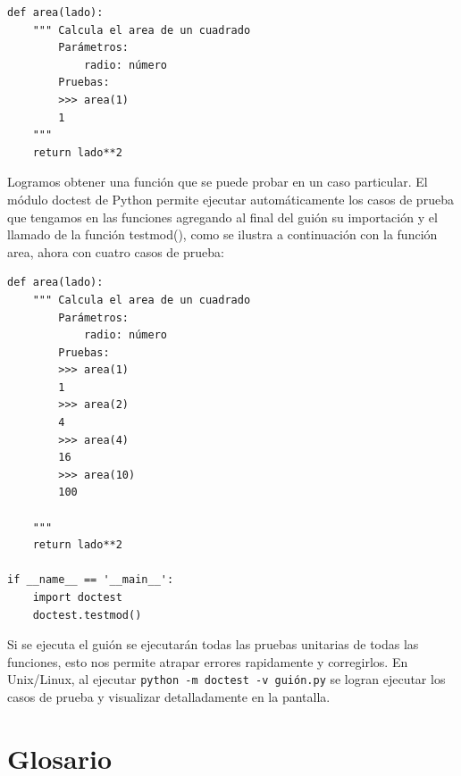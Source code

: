 \beforeverb
\begin{verbatim}
def area(lado):
    """ Calcula el area de un cuadrado
        Parámetros:
            radio: número
        Pruebas:
        >>> area(1)
        1        
    """
    return lado**2
\end{verbatim}
\afterverb

Logramos obtener una función que se puede probar en un caso particular. El 
módulo doctest de Python permite ejecutar automáticamente los casos de 
prueba que tengamos en las funciones agregando al final del guión
su importación y el llamado de la función testmod(), como se ilustra a
continuación con la función area, ahora con cuatro casos de prueba:

\beforeverb
\begin{verbatim}
def area(lado):
    """ Calcula el area de un cuadrado
        Parámetros:
            radio: número
        Pruebas:
        >>> area(1)
        1
        >>> area(2)
        4
        >>> area(4)
        16
        >>> area(10)
        100
        
    """
    return lado**2

if __name__ == '__main__':
    import doctest
    doctest.testmod()
\end{verbatim}
\afterverb

Si se ejecuta el guión se ejecutarán todas las pruebas unitarias de todas
las funciones, esto nos permite atrapar errores rapidamente y corregirlos. 
En Unix/Linux, al ejecutar \verb+python -m doctest -v guión.py+ se logran 
ejecutar los casos de prueba y visualizar detalladamente en la pantalla.

\section{Glosario}


